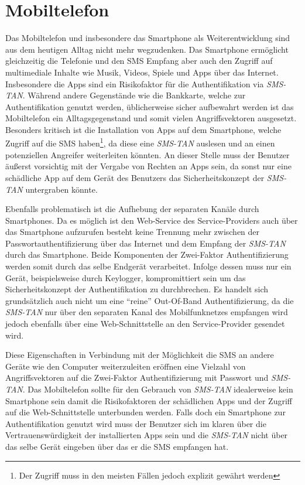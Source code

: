 \documentclass[11pt,a4paper,ngerman]{scrreprt}
\begin{document}
\section{Mobiltelefon}
Das Mobiltelefon und insbesondere das Smartphone als Weiterentwicklung sind aus dem heutigen Alltag nicht mehr wegzudenken. Das Smartphone ermöglicht gleichzeitig die Telefonie und den SMS Empfang aber auch den Zugriff auf multimediale Inhalte wie Musik, Videos, Spiele und Apps über das Internet. Insbesondere die Apps sind ein Risikofaktor für die Authentifikation via \textit{SMS-TAN}. Während andere Gegenstände wie die Bankkarte, welche zur Authentifikation genutzt werden, üblicherweise sicher aufbewahrt werden ist das Mobiltelefon ein Alltagsgegenstand und somit vielen Angriffsvektoren ausgesetzt. Besonders kritisch ist die Installation von Apps auf dem Smartphone, welche Zugriff auf die SMS haben\footnote{Der Zugriff muss in den meisten Fällen jedoch explizit gewährt werden}, da diese eine \textit{SMS-TAN} auslesen und an einen potenziellen Angreifer weiterleiten könnten. An dieser Stelle muss der Benutzer äußerst vorsichtig mit der Vergabe von Rechten an Apps sein, da sonst nur eine schädliche App auf dem Gerät des Benutzers das Sicherheitskonzept der \textit{SMS-TAN} untergraben könnte.

Ebenfalls problematisch ist die Aufhebung der separaten Kanäle durch Smartphones. Da es möglich ist den Web-Service des Service-Providers auch über das Smartphone aufzurufen besteht keine Trennung mehr zwischen der Passwortauthentifizierung über das Internet und dem Empfang der \textit{SMS-TAN} durch das Smartphone. Beide Komponenten der Zwei-Faktor Authentifizierung werden somit durch das selbe Endgerät verarbeitet. Infolge dessen muss nur ein Gerät, beispielsweise durch Keylogger, kompromittiert sein um das Sicherheitskonzept der Authentifikation zu durchbrechen. Es handelt sich grundsätzlich auch nicht um eine ``reine'' Out-Of-Band Authentifizierung, da die \textit{SMS-TAN} nur über den separaten Kanal des Mobilfunknetzes empfangen wird jedoch ebenfalls über eine Web-Schnittstelle an den Service-Provider gesendet wird.

Diese Eigenschaften in Verbindung mit der Möglichkeit die SMS an andere Geräte wie den Computer weiterzuleiten eröffnen eine Vielzahl von Angriffsvektoren auf die Zwei-Faktor Authentifizierung mit Passwort und \textit{SMS-TAN}. Das Mobiltelefon sollte für den Gebrauch von \textit{SMS-TAN} idealerweise kein Smartphone sein damit die Risikofaktoren der schädlichen Apps und der Zugriff auf die Web-Schnittstelle unterbunden werden. Falls doch ein Smartphone zur Authentifikation genutzt wird muss der Benutzer sich im klaren über die Vertrauenswürdigkeit der installierten Apps sein und die \textit{SMS-TAN} nicht über das selbe Gerät eingeben über das er die SMS empfangen hat.
\end{document}
